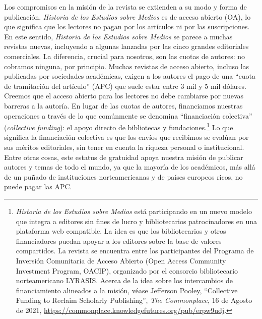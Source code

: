 \documentclass{tufte-handout}
\begin{document}
Los compromisos en la misión de la revista se extienden a su modo y
forma de publicación. \emph{Historia de los Estudios sobre Medios} es de
acceso abierto (OA), lo que significa que los lectores no pagan por los
artículos ni por las suscripciones. En este sentido, \emph{Historia de
los Estudios sobre Medios} se parece a muchas revistas nuevas,
incluyendo a algunas lanzadas por las cinco grandes editoriales
comerciales. La diferencia, crucial para nosotros, son las cuotas de
autores: no cobramos ninguna, por principio. Muchas revistas de acceso
abierto, incluso las publicadas por sociedades académicas, exigen a los
autores el pago de una ``cuota de tramitación del artículo'' (APC) que
suele estar entre 3 mil y 5 mil dólares. Creemos que el acceso abierto
para los lectores no debe cambiarse por nuevas barreras a la autoría. En
lugar de las cuotas de autores, financiamos nuestras operaciones a
través de lo que comúnmente se denomina ``financiación colectiva''
(\emph{collective funding}): el apoyo directo de bibliotecas y
fundaciones.\footnote{\emph{Historia de los Estudios sobre Medios} está
  participando en un nuevo modelo que integra a editores sin fines de
  lucro y bibliotecarios patrocinadores en una plataforma web
  compatible. La idea es que los bibliotecarios y otros financiadores
  puedan apoyar a los editores sobre la base de valores compartidos. La
  revista se encuentra entre los participantes del Programa de Inversión
  Comunitaria de Acceso Abierto (Open Access Community Investment
  Program, OACIP), organizado por el consorcio bibliotecario
  norteamericano LYRASIS. Acerca de la idea sobre los intercambios de
  financiamiento alineados a la misión, véase Jefferson Pooley,
  ``Collective Funding to Reclaim Scholarly Publishing'', \emph{The
  Commonplace}, 16 de Agosto de 2021,
  \url{https://commonplace.knowledgefutures.org/pub/erpw9udj}.} Lo que
significa la financiación colectiva es que los envíos que recibimos se
evalúan por sus méritos editoriales, sin tener en cuenta la riqueza
personal o institucional. Entre otras cosas, este estatus de gratuidad
apoya nuestra misión de publicar autores y temas de todo el mundo, ya
que la mayoría de los académicos, más allá de un puñado de instituciones
norteamericanas y de países europeos ricos, no puede pagar las APC.
\end{document}
